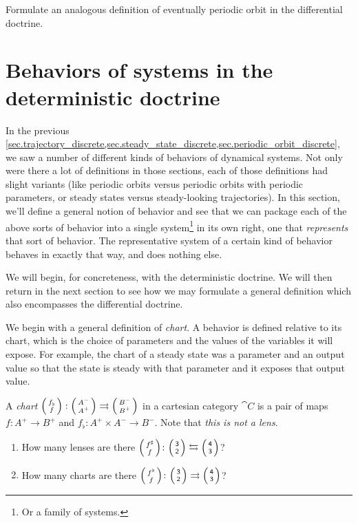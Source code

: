 \documentclass[DynamicalBook]{subfiles}
\begin{document}
\begin{exercise}
  Formulate an analogous definition of eventually periodic orbit in the
  differential doctrine.
\end{exercise}








\section{Behaviors of systems in the deterministic doctrine}\label{sec.behaviors}

In the previous
\cref{sec.trajectory_discrete,sec.steady_state_discrete,sec.periodic_orbit_discrete},
we saw a number of different kinds of behaviors of dynamical systems. Not only
were there a lot of definitions in those sections, each of those definitions had
slight variants (like periodic orbits versus periodic orbits with periodic
parameters, or steady states versus steady-looking trajectories). In this
section, we'll define a general notion of behavior and see that we can package
each of the above sorts of behavior into a single system\footnote{Or a family of
systems.} in its own right, one that \emph{represents} that sort of
behavior. The representative system of a certain kind of behavior behaves in
exactly that way, and does nothing else.

We will begin, for concreteness, with the deterministic doctrine. We will then
return in the next section to see how we may formulate a general definition
which also encompasses the differential doctrine.

We begin with a general definition of \emph{chart}. A behavior is defined
relative to its chart, which is the choice of parameters and the values of the
variables it will expose. For example, the chart of a steady state was a
parameter and an output value so that the state is steady with that parameter
and it exposes that output value.

\begin{definition}\label{def.chart_discrete}
  A \emph{chart} $\lens{f_{\flat}}{f} : \lens{A^-}{A^+} \rightrightarrows
  \lens{B^-}{B^+}$ in a cartesian category $\cat{C}$ is a pair of maps $f : A^+ \to B^+$ and $f_{\flat} : A^+
  \times A^- \to B^-$. Note that \emph{this is not a lens}.
\end{definition}

\begin{exercise}
\begin{enumerate}
	\item How many lenses are there $\lens{f^\sharp}{f}\colon\lens{\3}{\2}\fromto\lens{\4}{\3}$?
	\item How many charts are there $\lens{f^\flat}{f}\colon\lens{\3}{\2}\tto\lens{\4}{\3}$?
\qedhere
\end{enumerate}
\end{exercise}
\end{document}
